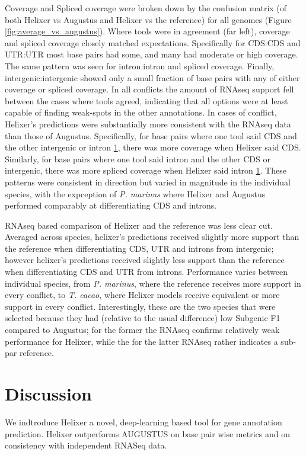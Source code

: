 \documentclass{bioinfo}
\begin{document}
Coverage and Spliced coverage were broken down by the confusion matrix (of both
Helixer vs Augustus and Helixer vs the reference) for all genomes (Figure \ref{fig:average_vs_augustus}). %
Where tools were in agreement (far left), coverage and spliced coverage closely matched
expectations. Specifically for CDS:CDS and UTR:UTR most base pairs had some, and many
had moderate or high coverage. The same pattern was seen for intron:intron and spliced
coverage. Finally, intergenic:intergenic showed only a small fraction of base pairs with 
any of either coverage or spliced coverage. In all conflicts the amount of RNAseq support
fell between the cases where tools agreed, indicating that all options were at least
capable of finding weak-spots in the other annotations.
In cases of conflict, Helixer's predictions were substantially more consistent with
the RNAseq data than those of Augustus. Specifically, for base pairs where one tool said CDS and
the other intergenic or intron \ref{}, there was more coverage when 
Helixer said CDS. Similarly, for base pairs where one tool said intron and the other 
CDS or intergenic, there was more spliced coverage when Helixer said intron \ref{}. 
These patterns were consistent in direction but varied in magnitude in the individual species,
with the expception of {\it P. marinus} where Helixer and Augustus performed comparably
at differentiating CDS and introns.

RNAseq based comparison of Helixer and the reference was less clear cut.
Averaged across species, helixer's predictions received slightly more support
than the reference when differentiating CDS, UTR and introns from intergenic;
however helixer's predictions received slightly less support than the reference 
when differentiating CDS and UTR from introns. Performance varies between individual
species, from {\it P. marinus}, where the reference receives more support
in every conflict, to {\it T. cacao}, where Helixer models receive equivalent
or more support in every conflict. Interestingly, these are the two species that
were selected because they had (relative to the usual difference) low Subgenic F1 compared to 
Augustus; for the former the RNAseq confirms relatively weak performance for Helixer, while the 
for the latter RNAseq rather indicates a sub-par reference. 

\section{Discussion}
We indtroduce Helixer a novel, deep-learning based tool for gene annotation
prediction. Helixer outperforms AUGUSTUS on base pair wise metrics and on 
consistency with independent RNASeq data. 
\end{document}

